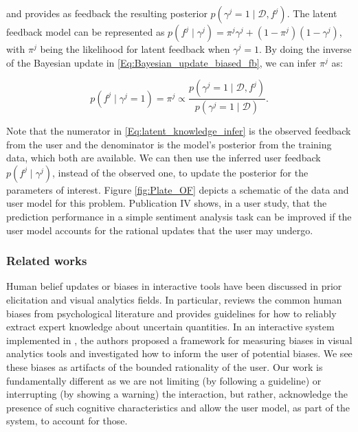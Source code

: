 \documentclass[dissertation,math,vertlayout,pdfa,colorlinks]{aaltoseries}
\newcommand{\bD}{\mathcal{D}}
\begin{document}
\noindent and provides as feedback the resulting posterior  $p(\gamma^j=1 \mid \bD, f^{j})$. The latent feedback model can be represented as $p(f^{j}\mid \gamma^j) = \pi^j \gamma^j + (1-\pi^j) (1-\gamma^j)$, with $\pi^j$ being the likelihood for latent feedback when $\gamma^j=1$. By doing the inverse of the Bayesian update in \ref{Eq:Bayesian_update_biased_fb}, we can infer $\pi^j$ as:

\begin{equation}\label{Eq:latent_knowledge_infer}
p(f^{j}\mid \gamma^j=1)=\pi^j \propto \dfrac{p(\gamma^j=1 \mid \bD, f^{j})}{p(\gamma^j =1\mid \bD)}.
\end{equation}  

Note that the numerator in \ref{Eq:latent_knowledge_infer} is the observed feedback from the user and the denominator is the model's posterior from the training data, which both are available. We can then use the inferred user feedback $p(f^{j}\mid \gamma^j)$, instead of the observed one, to update the posterior for the parameters of interest. Figure \ref{fig:Plate_OF} depicts a schematic of the data and user model for this problem. Publication IV shows, in a user study, that the prediction performance in a simple sentiment analysis task can be improved if the user model accounts for the rational updates that the user may undergo.

\subsubsection{Related works}

Human belief updates or biases in interactive tools have been discussed in prior elicitation \cite{garthwaite2005statistical} and visual analytics \cite{bias_warning} fields. In particular, \cite{garthwaite2005statistical} reviews the common human biases from psychological literature and provides guidelines for how to reliably extract expert knowledge about uncertain quantities. In an interactive system implemented in \cite{bias_warning}, the authors proposed a framework for measuring biases in visual analytics tools and investigated how to inform the user of potential biases. We see these biases as artifacts of the bounded rationality of the user. Our work is fundamentally different as we are not limiting (by following a guideline) or interrupting (by showing a warning) the interaction, but rather, acknowledge the presence of such cognitive characteristics and allow the user model, as part of the system, to account for those. 
\end{document}
